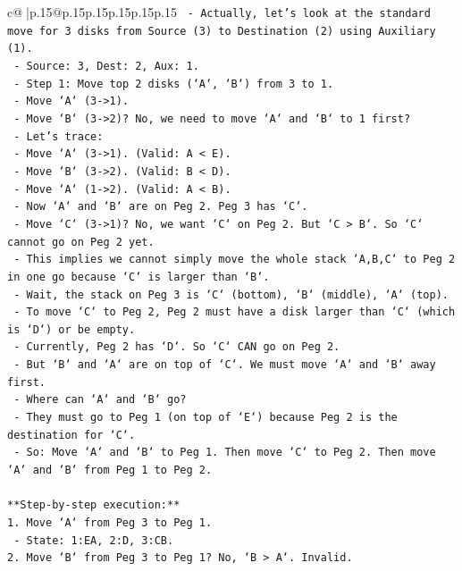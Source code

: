\documentclass{article}
\begin{document}
{\begin{supertabular}{c@{$\;$}|p{.15\linewidth}@{}p{.15\linewidth}p{.15\linewidth}p{.15\linewidth}p{.15\linewidth}p{.15\linewidth}}
{{{\texttt{   {-} Actually, let's look at the standard move for 3 disks from Source (3) to Destination (2) using Auxiliary (1).} \\
\texttt{   {-} Source: 3, Dest: 2, Aux: 1.} \\
\texttt{   {-} Step 1: Move top 2 disks (`A`, `B`) from 3 to 1.} \\
\texttt{     {-} Move `A` (3{-}>1).} \\
\texttt{     {-} Move `B` (3{-}>2)? No, we need to move `A` and `B` to 1 first?} \\
\texttt{     {-} Let's trace:} \\
\texttt{       {-} Move `A` (3{-}>1). (Valid: A < E).} \\
\texttt{       {-} Move `B` (3{-}>2). (Valid: B < D).} \\
\texttt{       {-} Move `A` (1{-}>2). (Valid: A < B).} \\
\texttt{       {-} Now `A` and `B` are on Peg 2. Peg 3 has `C`.} \\
\texttt{       {-} Move `C` (3{-}>1)? No, we want `C` on Peg 2. But `C > B`. So `C` cannot go on Peg 2 yet.} \\
\texttt{       {-} This implies we cannot simply move the whole stack `A,B,C` to Peg 2 in one go because `C` is larger than `B`.} \\
\texttt{       {-} Wait, the stack on Peg 3 is `C` (bottom), `B` (middle), `A` (top).} \\
\texttt{       {-} To move `C` to Peg 2, Peg 2 must have a disk larger than `C` (which is `D`) or be empty.} \\
\texttt{       {-} Currently, Peg 2 has `D`. So `C` CAN go on Peg 2.} \\
\texttt{       {-} But `B` and `A` are on top of `C`. We must move `A` and `B` away first.} \\
\texttt{       {-} Where can `A` and `B` go?} \\
\texttt{         {-} They must go to Peg 1 (on top of `E`) because Peg 2 is the destination for `C`.} \\
\texttt{         {-} So: Move `A` and `B` to Peg 1. Then move `C` to Peg 2. Then move `A` and `B` from Peg 1 to Peg 2.} \\
\\ 
\texttt{**Step{-}by{-}step execution:**} \\
\texttt{1. Move `A` from Peg 3 to Peg 1.} \\
\texttt{   {-} State: 1:EA, 2:D, 3:CB.} \\
\texttt{2. Move `B` from Peg 3 to Peg 1? No, `B > A`. Invalid.} \\
}}}
\end{supertabular}}
\end{document}
